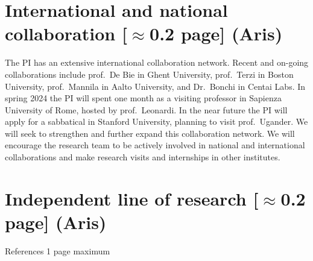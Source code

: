 \documentclass[a4paper,11pt]{article}
\begin{document}
\section{International and national collaboration {\color{orange}[$\approx$0.2 page]} {\color{teal}(Aris)}}


The PI has an extensive international collaboration network. 
Recent and on-going collaborations include
prof.\ De Bie in Ghent University, 
prof.\ Terzi in Boston University,
prof.\ Mannila in Aalto University, and 
Dr.\ Bonchi in Centai Labs.
In spring 2024 the PI will spent one month as a visiting professor 
in Sapienza University of Rome, hosted by prof.\ Leonardi.
In the near future the PI will apply for a sabbatical in Stanford University, 
planning to visit prof.\ Ugander. 
We will seek to strengthen and further expand this collaboration network.
We will encourage the research team to be actively involved in national and international collaborations
and make research visits and internships in other institutes.

\section{Independent line of research {\color{orange}[$\approx$0.2 page]} {\color{teal}(Aris)}}




{\small
\setlength{\bibsep}{0pt}


}

{\color{orange}References 1 page maximum} 

% 
\end{document}
